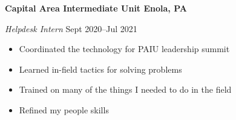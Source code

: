 \textbf{Capital Area Intermediate Unit \hfill  Enola, PA} \par
\textit{Helpdesk Intern} \hfill Sept 2020--Jul 2021 \par
\begin{itemize}
	\item Coordinated the technology for PAIU leadership summit
	\item Learned in-field tactics for solving problems
	\item Trained on many of the things I needed to do in the field
	\item Refined my people skills
\end{itemize} \par